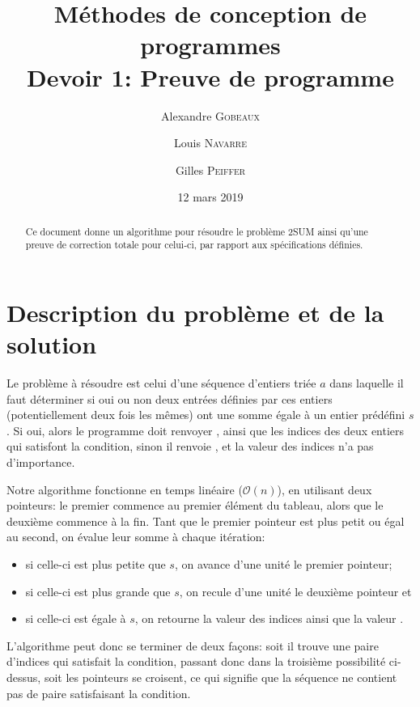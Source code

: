 \documentclass{elsarticle}
\begin{document}
\title{Méthodes de conception de programmes \\ Devoir 1: Preuve de programme}
\date{12 mars 2019}

\address[add1]{École Polytechnique, Université catholique de Louvain, Place de l'Université 1, 1348 Ottignies-Louvain-la-Neuve, Belgique}

\author[add1]{Alexandre \textsc{Gobeaux}}
\author[add1]{Louis \textsc{Navarre}}
\author[add1]{Gilles \textsc{Peiffer}}

\begin{abstract}
Ce document donne un algorithme pour résoudre le problème 2SUM ainsi qu'une preuve de correction totale pour celui-ci, par rapport aux spécifications définies.
\end{abstract}
\maketitle

\section{Description du problème et de la solution}
Le problème à résoudre est celui d'une séquence d'entiers triée $a$ dans laquelle il faut déterminer si oui ou non deux entrées définies par ces entiers (potentiellement deux fois les mêmes) ont une somme égale à un entier prédéfini $s$.
Si oui, alors le programme doit renvoyer \og {} \fg, ainsi que les indices des deux entiers qui satisfont la condition, sinon il renvoie \og {} \fg, et la valeur des indices n'a pas d'importance.

Notre algorithme fonctionne en temps linéaire ($\mathcal{O}(n)$), en utilisant deux pointeurs:
le premier commence au premier élément du tableau, alors que le deuxième commence à la fin.
Tant que le premier pointeur est plus petit ou égal au second, on évalue leur somme à chaque itération:
\begin{itemize}
	\item si celle-ci est plus petite que $s$, on avance d'une unité le premier pointeur;
	\item si celle-ci est plus grande que $s$, on recule d'une unité le deuxième pointeur et
	\item si celle-ci est égale à $s$, on retourne la valeur des indices ainsi que la valeur \og {}\fg.
\end{itemize}
L'algorithme peut donc se terminer de deux façons: soit il trouve une paire d'indices qui satisfait la condition, passant donc dans la troisième possibilité ci-dessus,
soit les pointeurs se croisent, ce qui signifie que la séquence ne contient pas de paire satisfaisant la condition.
\end{document}
